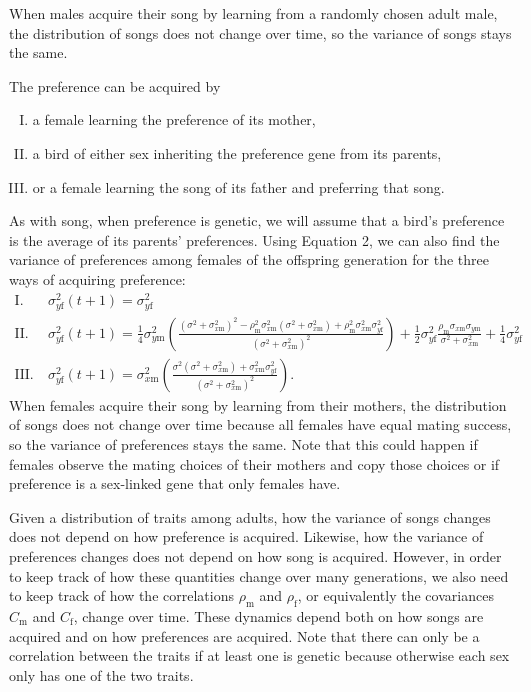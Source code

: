 \documentclass{article}
\newcommand{\x}[1]{\text{#1}}
\begin{document}
When males acquire their song by learning from a randomly chosen adult male, the distribution of songs does not change over time, so the variance of songs stays the same. 

The preference can be acquired by 
\begin{enumerate}[I.]
\item a female learning the preference of its mother,
\item a bird of either sex inheriting the preference gene from its parents,
\item or a female learning the song of its father and preferring that song.
\end{enumerate}
As with song, when preference is genetic, we will assume that a bird's preference is the average of its parents' preferences. Using Equation 2, we can also find the variance of preferences among females of the offspring generation for the three ways of acquiring preference:
\begin{align*}
\x{I.} \ & \sigma_{y\x{f}}^2(t+1) = \sigma_{y\x{f}}^2
\\\x{II.} \ & \sigma_{y\x{f}}^2(t+1) = \frac{1}{4}\sigma_{y\x{m}}^2\left(\frac{(\sigma^2+\sigma_{x\x{m}}^2)^2-\rho_\x{m}^2\sigma_{x\x{m}}^2(\sigma^2+\sigma_{x\x{m}}^2)+\rho_\x{m}^2\sigma_{x\x{m}}^2\sigma_{y\x{f}}^2}{(\sigma^2+\sigma_{x\x{m}}^2)^2}\right)+\frac{1}{2}\sigma_{y\x{f}}^2\frac{\rho_\x{m}\sigma_{x\x{m}}\sigma_{y\x{m}}}{\sigma^2+\sigma_{x\x{m}}^2}+\frac{1}{4}\sigma_{y\x{f}}^2
\\\x{III.} \ & \sigma_{y\x{f}}^2(t+1) = \sigma_{x\x{m}}^2\left(\frac{\sigma^2(\sigma^2+\sigma_{x\x{m}}^2)+\sigma_{ x\x{m}}^2\sigma_{y\x{f}}^2}{(\sigma^2+\sigma_{x\x{m}}^2)^2}\right).
\end{align*}
When females acquire their song by learning from their mothers, the distribution of songs does not change over time because all females have equal mating success, so the variance of preferences stays the same. Note that this could happen if females observe the mating choices of their mothers and copy those choices or if preference is a sex-linked gene that only females have. 

Given a distribution of traits among adults, how the variance of songs changes does not depend on how preference is acquired. Likewise, how the variance of preferences changes does not depend on how song is acquired. However, in order to keep track of how these quantities change over many generations, we also need to keep track of how the correlations $\rho_\x{m}$ and $\rho_\x{f}$, or equivalently the covariances $C_\x{m}$ and $C_\x{f}$, change over time. These dynamics depend both on how songs are acquired and on how preferences are acquired. Note that there can only be a correlation between the traits if at least one is genetic because otherwise each sex only has one of the two traits.
\end{document}
